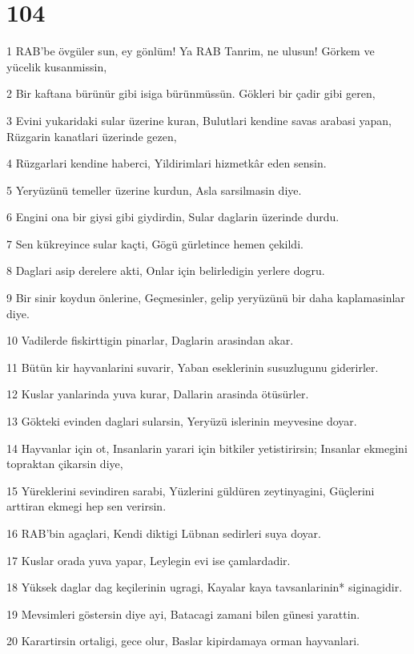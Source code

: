\chapter{104}

\par 1 RAB'be övgüler sun, ey gönlüm! Ya RAB Tanrim, ne ulusun! Görkem ve yücelik kusanmissin,
\par 2 Bir kaftana bürünür gibi isiga bürünmüssün. Gökleri bir çadir gibi geren,
\par 3 Evini yukaridaki sular üzerine kuran, Bulutlari kendine savas arabasi yapan, Rüzgarin kanatlari üzerinde gezen,
\par 4 Rüzgarlari kendine haberci, Yildirimlari hizmetkâr eden sensin.
\par 5 Yeryüzünü temeller üzerine kurdun, Asla sarsilmasin diye.
\par 6 Engini ona bir giysi gibi giydirdin, Sular daglarin üzerinde durdu.
\par 7 Sen kükreyince sular kaçti, Gögü gürletince hemen çekildi.
\par 8 Daglari asip derelere akti, Onlar için belirledigin yerlere dogru.
\par 9 Bir sinir koydun önlerine, Geçmesinler, gelip yeryüzünü bir daha kaplamasinlar diye.
\par 10 Vadilerde fiskirttigin pinarlar, Daglarin arasindan akar.
\par 11 Bütün kir hayvanlarini suvarir, Yaban eseklerinin susuzlugunu giderirler.
\par 12 Kuslar yanlarinda yuva kurar, Dallarin arasinda ötüsürler.
\par 13 Gökteki evinden daglari sularsin, Yeryüzü islerinin meyvesine doyar.
\par 14 Hayvanlar için ot, Insanlarin yarari için bitkiler yetistirirsin; Insanlar ekmegini topraktan çikarsin diye,
\par 15 Yüreklerini sevindiren sarabi, Yüzlerini güldüren zeytinyagini, Güçlerini arttiran ekmegi hep sen verirsin.
\par 16 RAB'bin agaçlari, Kendi diktigi Lübnan sedirleri suya doyar.
\par 17 Kuslar orada yuva yapar, Leylegin evi ise çamlardadir.
\par 18 Yüksek daglar dag keçilerinin ugragi, Kayalar kaya tavsanlarinin* siginagidir.
\par 19 Mevsimleri göstersin diye ayi, Batacagi zamani bilen günesi yarattin.
\par 20 Karartirsin ortaligi, gece olur, Baslar kipirdamaya orman hayvanlari.
